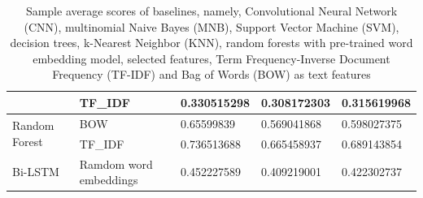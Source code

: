 \begin{table}[]
{\begin{tabular}{@{}lllll@{}}
\multicolumn{1}{|l|}{} &
  \multicolumn{1}{l|}{TF\_IDF} &
  \multicolumn{1}{l|}{0.330515298} &
  \multicolumn{1}{l|}{0.308172303} &
  \multicolumn{1}{l|}{0.315619968} \\ \midrule
\multicolumn{1}{|l|}{\multirow{2}{*}{Random Forest}} &
  \multicolumn{1}{l|}{BOW} &
  \multicolumn{1}{l|}{0.65599839} &
  \multicolumn{1}{l|}{0.569041868} &
  \multicolumn{1}{l|}{0.598027375} \\ \cmidrule(l){2-5} 
\multicolumn{1}{|l|}{} &
  \multicolumn{1}{l|}{TF\_IDF} &
  \multicolumn{1}{l|}{0.736513688} &
  \multicolumn{1}{l|}{0.665458937} &
  \multicolumn{1}{l|}{0.689143854} \\ \midrule
\multicolumn{1}{|l|}{Bi-LSTM} &
  \multicolumn{1}{l|}{Ramdom word embeddings} &
  \multicolumn{1}{l|}{0.452227589} &
  \multicolumn{1}{l|}{0.409219001} &
  \multicolumn{1}{l|}{0.422302737} \\ \bottomrule
\end{tabular}%
}

\caption{Sample average scores of baselines, namely, Convolutional Neural Network (CNN), multinomial Naive Bayes (MNB), Support Vector Machine (SVM), decision trees, k-Nearest Neighbor (KNN), random forests with pre-trained word embedding model, selected features, Term Frequency-Inverse Document Frequency (TF-IDF) and Bag of Words (BOW) as text features}
\label{tab:Sample average scores baselines}
\end{table}

